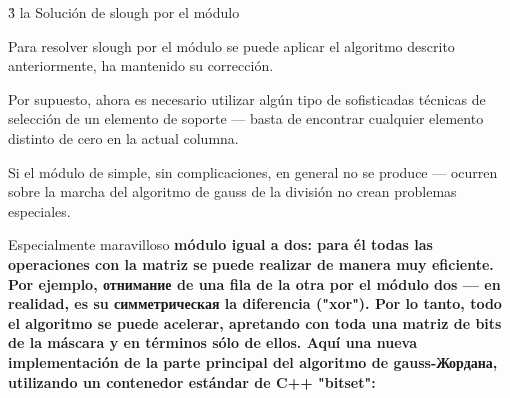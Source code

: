 \h3{ la Solución de slough por el módulo }

Para resolver slough por el módulo se puede aplicar el algoritmo descrito anteriormente, ha mantenido su corrección.

Por supuesto, ahora es necesario utilizar algún tipo de sofisticadas técnicas de selección de un elemento de soporte --- basta de encontrar cualquier elemento distinto de cero en la actual columna.

Si el módulo de simple, sin complicaciones, en general no se produce --- ocurren sobre la marcha del algoritmo de gauss de la división no crean problemas especiales.

Especialmente maravilloso \bf{módulo igual a dos}: para él todas las operaciones con la matriz se puede realizar de manera muy eficiente. Por ejemplo, отнимание de una fila de la otra por el módulo dos --- en realidad, es su симметрическая la diferencia ("xor"). Por lo tanto, todo el algoritmo se puede acelerar, apretando con toda una matriz de bits de la máscara y en términos sólo de ellos. Aquí una nueva implementación de la parte principal del algoritmo de gauss-Жордана, utilizando un contenedor estándar de C++ "bitset":


